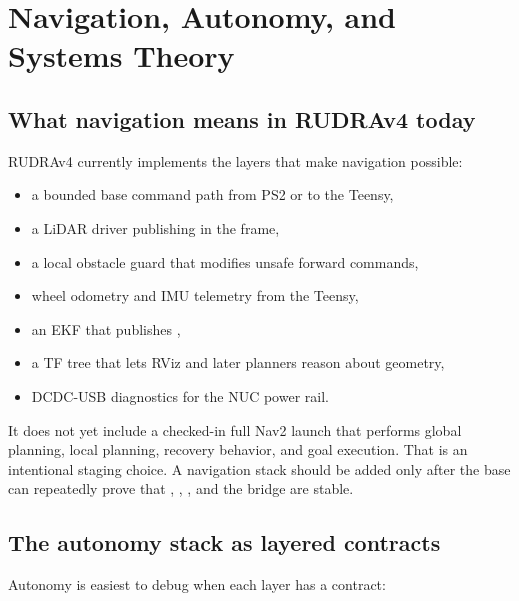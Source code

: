 \chapter{Navigation, Autonomy, and Systems Theory}

\section{What navigation means in RUDRAv4 today}

RUDRAv4 currently implements the layers that make navigation possible:

\begin{itemize}
  \item a bounded base command path from PS2 or  to the Teensy,
  \item a LiDAR driver publishing  in the  frame,
  \item a local obstacle guard that modifies unsafe forward commands,
  \item wheel odometry and IMU telemetry from the Teensy,
  \item an EKF that publishes ,
  \item a TF tree that lets RViz and later planners reason about geometry,
  \item DCDC-USB diagnostics for the NUC power rail.
\end{itemize}

It does not yet include a checked-in full Nav2 launch that performs global planning,
local planning, recovery behavior, and goal execution. That is an intentional staging
choice. A navigation stack should be added only after the base can repeatedly prove
that , , , and the
 bridge are stable.

\section{The autonomy stack as layered contracts}

Autonomy is easiest to debug when each layer has a contract:

